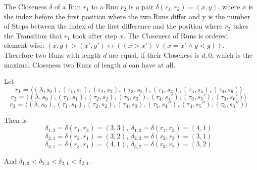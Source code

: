 \begin{definition}[name = Closeness of Runs]\label{def:runs_closeness}
  The Closeness \(\delta\) of a Run \(r_1\) to a Run \(r_2\) is a pair \(\delta(r_1,r_2) = (x,y)\), where \(x\) is the index before the first position where the two Runs differ and y is the number of Steps between the index of the first difference and the position where \(r_2\) takes the Transition that \(r_1\) took after step \(x\).
  The Closeness of Runs is ordered element-wise: \((x,y) > (x',y') \leftrightarrow ((x > x') \lor (x = x' \land y < y))\).
  Therefore two Runs with length \(d\) are equal, if their Closeness is \(d,0\), which is the maximal Closeness two Runs of length \(d\) can have at all.
\end{definition}

\begin{exmp}
  Let
  \[r_1 = \langle (\lambda, s_0), (\tau_1,s_1), (\tau_2,s_2), (\tau_3,s_3), (\tau_4,s_4), (\tau_5,s_5), (\tau_6,s_6) \rangle\]
  \[r_2 = \langle (\lambda, s_0), (\tau_1,s_1), (\tau_2,s_2), (\tau_5,s_3'), (\tau_4,s_4'), (\tau_6,s_5'), (\tau_3,s_6') \rangle\]
  \[r_3 = \langle (\lambda, s_0), (\tau_1,s_1), (\tau_2,s_2), (\tau_3,s_3), (\tau_5,s_4''), (\tau_4,s_5''), (\tau_6,s_6'') \rangle\]

  Then is
  \[\delta_{1,2} = \delta(r_1,r_2) = (3,3),\ \delta_{1,3} = \delta(r_1,r_3) = (4,1)\]
  \[\delta_{2,1} = \delta(r_2,r_1) = (3,2),\ \delta_{2,3} = \delta(r_2,r_3) = (3,1)\]
  \[\delta_{3,1} = \delta(r_3,r_1) = (4,1),\ \delta_{3,2} = \delta(r_3,r_2) = (3,2)\]

  And \(\delta_{1,3} < \delta_{2,3} < \delta_{2,1} < \delta_{2,1}\).


\end{exmp}

